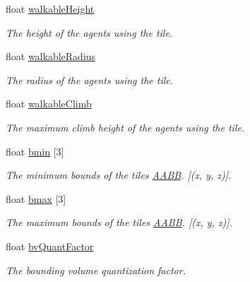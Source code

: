 \begin{DoxyCompactItemize}
\mbox{\label{structdtMeshHeader_a841dd28baa87ecf4a67868d44d212349}} 
float \hyperlink{structdtMeshHeader_a841dd28baa87ecf4a67868d44d212349}{walkable\+Height}
\begin{DoxyCompactList}\small\item\em The height of the agents using the tile. \end{DoxyCompactList}\item 
\mbox{\label{structdtMeshHeader_af46713cd7140c9cea829730c246e146d}} 
float \hyperlink{structdtMeshHeader_af46713cd7140c9cea829730c246e146d}{walkable\+Radius}
\begin{DoxyCompactList}\small\item\em The radius of the agents using the tile. \end{DoxyCompactList}\item 
\mbox{\label{structdtMeshHeader_abd05a74e3a83474d0073118059f11273}} 
float \hyperlink{structdtMeshHeader_abd05a74e3a83474d0073118059f11273}{walkable\+Climb}
\begin{DoxyCompactList}\small\item\em The maximum climb height of the agents using the tile. \end{DoxyCompactList}\item 
\mbox{\label{structdtMeshHeader_a0635724e9a861406960e4905895eb8b5}} 
float \hyperlink{structdtMeshHeader_a0635724e9a861406960e4905895eb8b5}{bmin} \mbox{[}3\mbox{]}
\begin{DoxyCompactList}\small\item\em The minimum bounds of the tile\textquotesingle{}s \hyperlink{classAABB}{A\+A\+BB}. \mbox{[}(x, y, z)\mbox{]}. \end{DoxyCompactList}\item 
\mbox{\label{structdtMeshHeader_a565cb2ca5da5ce27c546d0d970be5505}} 
float \hyperlink{structdtMeshHeader_a565cb2ca5da5ce27c546d0d970be5505}{bmax} \mbox{[}3\mbox{]}
\begin{DoxyCompactList}\small\item\em The maximum bounds of the tile\textquotesingle{}s \hyperlink{classAABB}{A\+A\+BB}. \mbox{[}(x, y, z)\mbox{]}. \end{DoxyCompactList}\item 
float \hyperlink{structdtMeshHeader_ab415943e0064a6ed0501e8e7da0e5d26}{bv\+Quant\+Factor}
\begin{DoxyCompactList}\small\item\em The bounding volume quantization factor. \end{DoxyCompactList}\end{DoxyCompactItemize}


